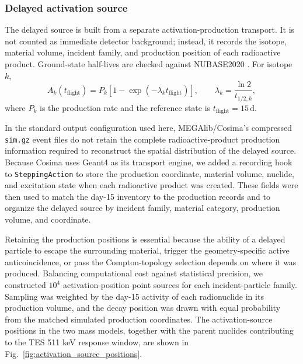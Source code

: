 \documentclass[11pt]{article}
\begin{document}
\endgroup

\subsubsection{Delayed activation source}
\label{subsec:delayed_source}

The delayed source is built from a separate activation-production transport. It
is not counted as immediate detector background; instead, it records the isotope,
material volume, incident family, and production position of each radioactive
product. Ground-state half-lives are checked against NUBASE2020
\cite{Kondev2021NUBASE}. For isotope $k$,
\begin{equation}
  A_k(t_{\mathrm{flight}})=P_k\left[1-\exp(-\lambda_k t_{\mathrm{flight}})\right],
  \qquad \lambda_k=\frac{\ln2}{t_{1/2,k}},
\end{equation}
where $P_k$ is the production rate and the reference state is
$t_{\mathrm{flight}}=15\,\mathrm{d}$.

\begingroup

In the standard output configuration used here,
MEGAlib/Cosima's compressed \texttt{sim.gz} event files do not retain the
complete radioactive-product production information required to reconstruct
the spatial distribution of the delayed source. Because Cosima uses Geant4 as
its transport engine, we added a recording hook to \texttt{SteppingAction} to
store the production coordinate, material volume, nuclide, and excitation
state when each radioactive product was created. These fields were then used
to match the day-15 inventory to the production records and to organize the
delayed source by incident family, material category, production volume, and
coordinate.

Retaining the production positions is essential because the ability of a
delayed particle to escape the surrounding material, trigger the
geometry-specific active anticoincidence, or pass the Compton-topology
selection depends on where it was produced. Balancing computational
cost against statistical precision, we constructed $10^4$ activation-position
point sources for each incident-particle family. Sampling was weighted by the
day-15 activity of each radionuclide in its production volume, and the decay
position was drawn with equal probability from the matched simulated
production coordinates. The activation-source positions in the two mass
models, together with the parent nuclides contributing to the TES 511 keV
response window, are shown in
Fig.~\ref{fig:activation_source_positions}.
\endgroup
\end{document}
